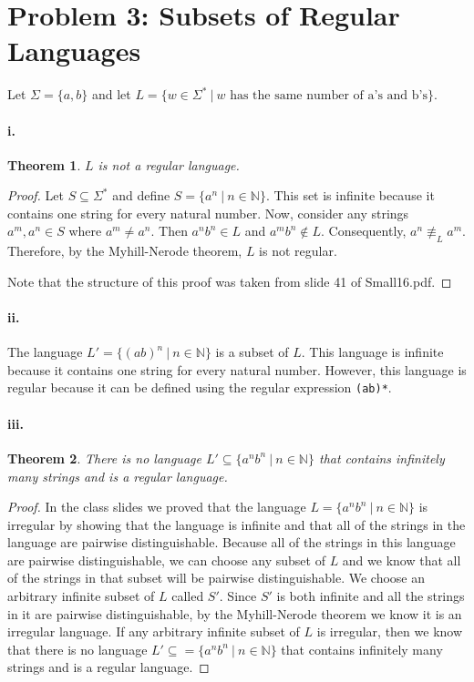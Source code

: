 \documentclass[10pt,letter]{article}
\newtheorem*{thm}{Theorem}
\begin{document}
\section*{Problem 3: Subsets of Regular Languages}
Let $\Sigma = \{a, b\}$ and let $L = \{ w \in \Sigma^* \ | \ w \text{ has the same number of a's and b's} \}$. 

\paragraph{i.} 
\begin{thm} $L$ is not a regular language. \end{thm}

\begin{proof}
Let $S \subseteq \Sigma^*$ and define $S = \{a^n \ | \ n \in \mathbb{N} \}$. This set is infinite because it contains one string for every natural number. Now, consider any strings $a^m, a^n \in S$ where $a^m \not = a^n$. Then $a^n b^n \in L$ and $a^m b^n \not \in L$. Consequently, $a^n \not \equiv_L a^m$. Therefore, by the Myhill-Nerode theorem, $L$ is not regular.

Note that the structure of this proof was taken from slide 41 of Small16.pdf.
\end{proof}

\paragraph{ii.}
The language $L' = \{ (ab)^n \ | \ n \in \mathbb{N} \}$ is a subset of $L$. This language is infinite because it contains one string for every natural number. However, this language is regular because it can be defined using the regular expression \texttt{(ab)*}. 

\paragraph{iii.}
\begin{thm} There is no language $L' \subseteq  \{a^nb^n \ | \ n \in \mathbb{N} \}$ that contains infinitely many strings and is a regular language. \end{thm}
\begin{proof}
In the class slides we proved that the language $L = \{a^nb^n \ | \ n \in \mathbb{N} \}$ is irregular by showing that the language is infinite and that all of the strings in the language are pairwise distinguishable. Because all of the strings in this language are pairwise distinguishable, we can choose any subset of $L$ and we know that all of the strings in that subset will be pairwise distinguishable. We choose an arbitrary infinite subset of $L$ called $S'$. Since $S'$ is both infinite and all the strings in it are pairwise distinguishable, by the Myhill-Nerode theorem we know it is an irregular language. If any arbitrary infinite subset of $L$ is irregular, then we know that there is no language $L' \subseteq  = \{a^nb^n \ | \ n \in \mathbb{N} \}$ that contains infinitely many strings and is a regular language.
\end{proof}
\end{document}
